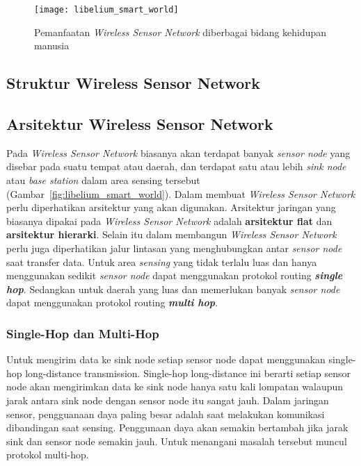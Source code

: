 \begin{figure} [H]
	\centering  
	\texttt{[image: libelium\_smart\_world]}  
	\caption[Pemanfaatan \textit{Wireless Sensor Network} diberbagai bidang kehidupan manusia]{Pemanfaatan \textit{Wireless Sensor Network} diberbagai bidang kehidupan manusia} 
	\label{fig:smartworld} 
\end{figure} 

\subsection{Struktur Wireless Sensor Network}

\subsection{Arsitektur Wireless Sensor Network}
Pada \textit{Wireless Sensor Network} biasanya akan terdapat banyak \textit{sensor node} yang disebar pada suatu tempat atau daerah, dan terdapat satu atau lebih \textit{sink node} atau \textit{base station} dalam area sensing tersebut (Gambar~\ref{fig:libelium_smart_world}). Dalam membuat \textit{Wireless Sensor Network} perlu diperhatikan arsitektur yang akan digunakan. Arsitektur jaringan yang biasanya dipakai pada \textit{Wireless Sensor Network} adalah \textbf{arsitektur flat} dan \textbf{arsitektur hierarki}. Selain itu dalam membangun \textit{Wireless Sensor Network} perlu juga diperhatikan jalur lintasan yang menghubungkan antar \textit{sensor node} saat transfer data. Untuk area \textit{sensing} yang tidak terlalu luas dan hanya menggunakan sedikit \textit{sensor node} dapat menggunakan protokol routing \textbf{\textit{single hop}}. Sedangkan untuk daerah yang luas dan memerlukan banyak \textit{sensor node} dapat menggunakan protokol routing \textbf{\textit{multi hop}}. 

\subsubsection{Single-Hop dan Multi-Hop}
Untuk mengirim data ke sink node setiap sensor node dapat menggunakan single-hop long-distance transmission. Single-hop long-distance ini berarti setiap sensor node akan mengirimkan data ke sink node hanya satu kali lompatan walaupun jarak antara sink node dengan sensor node itu sangat jauh. Dalam jaringan sensor, pengguanaan daya paling besar adalah saat melakukan komunikasi dibandingan saat sensing. Penggunaan daya akan semakin bertambah jika jarak sink dan sensor node semakin jauh. Untuk menangani masalah tersebut muncul protokol multi-hop.

